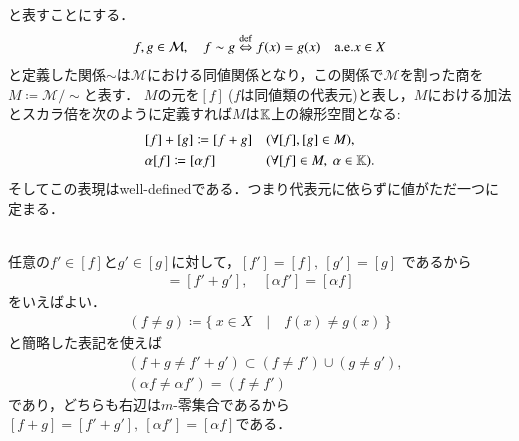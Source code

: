 と表すことにする．
\begin{align}
	f,g \in \mathcal{M},\quad f \sim g \overset{\mathrm{def}}{\Leftrightarrow} f(x) = g(x)\quad \mathrm{a.e.}x \in X
\end{align}
と定義した関係$\sim$は$\mathcal{M}$における同値関係となり，この関係で$\mathcal{M}$を割った商を$ M \coloneqq \mathcal{M}/\sim$と表す．
$M$の元を$[f]\ $($f$は同値類の代表元)と表し，$M$における加法とスカラ倍を次のように定義すれば$M$は$\mathbb{K}$上の線形空間となる:
\begin{align}
	&[f] + [g] \coloneqq [f+g] && (\forall [f],[g] \in M),\\
	&\alpha [f] \coloneqq [\alpha f] && (\forall [f] \in M,\ \alpha \in \K).
\end{align}
そしてこの表現はwell-definedである．つまり代表元に依らずに値がただ一つに定まる．
\begin{bcs}\mbox{}\\
	任意の$f' \in [f]$と$g' \in [g]$に対して，$[f'] = [f],\ [g'] = [g]$
	であるから
	\begin{align}
		[f + g] = [f' + g'],\quad [\alpha f'] = [\alpha f]
	\end{align}
	をいえばよい．
	\begin{align}
		(f \neq g) \coloneqq \{\ x \in X\quad |\quad f(x) \neq g(x)\ \}
	\end{align}
	と簡略した表記を使えば
	\begin{align}
		&(f+g \neq f'+g') \subset (f \neq f') \cup (g \neq g'), \\
		&(\alpha f \neq \alpha f') = (f \neq f')
	\end{align}
	であり，どちらも右辺は$m$-零集合であるから$[f + g] = [f' + g'],\ [\alpha f'] = [\alpha f]$である．
	\QED
\end{bcs}

